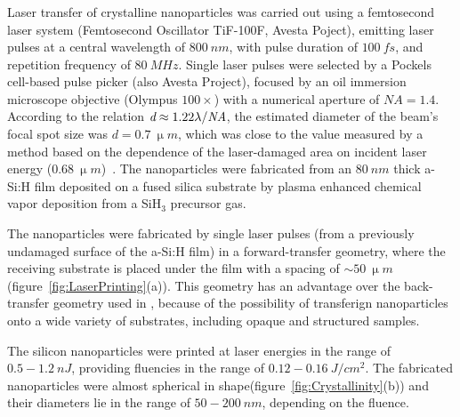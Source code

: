         \subsubsection{}
                Laser transfer of crystalline nanoparticles was carried out using a femtosecond laser system
            (Femtosecond Oscillator TiF-100F, Avesta Poject), emitting laser pulses at a central wavelength of $800~\si{nm}$,
            with pulse duration of $100~\si{fs}$, and repetition frequency of $80~\si{MHz}$. Single laser pulses were selected
            by a Pockels cell-based pulse picker (also Avesta Project), focused by an oil immersion microscope objective (Olympus $100\times$)
            with a numerical aperture of $\mathit{NA}=1.4$. According to the relation $\emph{d}\approx 1.22\lambda/\mathit{NA}$, the estimated
            diameter of the beam's focal spot size was $d=0.7~\si{\upmu m}$, which was close to the value measured by a method based on
            the dependence of the laser-damaged area on incident laser energy ($0.68~\si{\upmu m}$)~\cite{liu1982simple}.
            The nanoparticles were fabricated from an $80~\si{nm}$ thick a-Si:H film deposited on a fused silica substrate by
            plasma enhanced chemical vapor deposition from a SiH$_{3}$ precursor gas.

                The nanoparticles were fabricated by single laser pulses (from a previously undamaged surface of the a-Si:H film) in a
            forward-transfer geometry, where the receiving substrate is placed under the film with a spacing
            of $\sim 50~\si{\upmu m}$ (figure~\ref{fig:LaserPrinting}(a)). This geometry has an advantage over the back-transfer geometry
            used in \cite{zywietz2014laser}, because of the possibility of transferign nanoparticles onto a wide variety of substrates,
            including opaque and structured samples.

                The silicon nanoparticles were printed at laser energies in the range of $0.5-1.2~\si{nJ}$, providing fluencies in
            the range of $0.12-0.16~\si{J/cm^{2}}$. The fabricated nanoparticles were almost spherical in shape(figure~\ref{fig:Crystallinity}(b))
            and their diameters lie in the range of $50-200~\si{nm}$, depending on the fluence.

